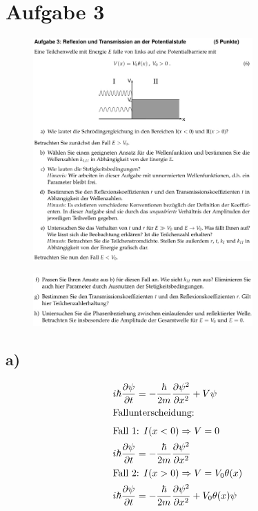 \section{Aufgabe 3}

\begin{figure}[H]
    \centering
    \includegraphics[width=0.75\textwidth]{./images/Aufgabe3a_e.jpg}
    \label{fig:4}
\end{figure}

\begin{figure}[H]
    \centering
    \includegraphics[width=0.75\textwidth]{./images/Aufgabe3f_h.jpg}
    \label{fig:5}
\end{figure}

\subsection{a)}

    \begin{align*}
        i\hbar \frac{\partial \psi}{\partial t} &= -\frac{\hbar}{2m} \frac{\partial \psi^2}{\partial x^2} + V \psi\\
        \intertext{Fallunterscheidung:
        }
        \intertext{Fall 1: $I(x<0) \Rightarrow V=0$
        }
        i\hbar \frac{\partial \psi}{\partial t} &= -\frac{\hbar}{2m} \frac{\partial \psi^2}{\partial x^2}
        \\
        \intertext{Fall 2: $I(x>0) \Rightarrow V=V_0\theta(x)$
        }
        i\hbar \frac{\partial \psi}{\partial t} &= -\frac{\hbar}{2m} \frac{\partial \psi^2}{\partial x^2} + V_0\theta(x) \psi
    \end{align*}

